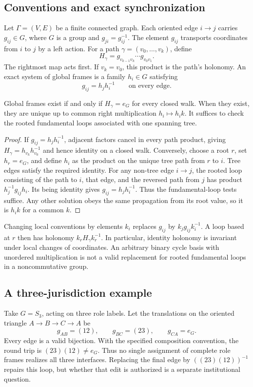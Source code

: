 \subsection{Conventions and exact synchronization}
Let $\Gamma=(V,E)$ be a finite connected graph. Each oriented edge $i\to j$ carries $g_{ij}\in G$, where $G$ is a group and $g_{ji}=g_{ij}^{-1}$. The element $g_{ij}$ transports coordinates from $i$ to $j$ by a left action. For a path $\gamma=(v_0,\ldots,v_k)$, define
\[
H_\gamma=g_{v_{k-1}v_k}\cdots g_{v_0v_1}.
\]
The rightmost map acts first. If $v_k=v_0$, this product is the path's holonomy. An exact system of global frames is a family $h_i\in G$ satisfying
\[
g_{ij}=h_jh_i^{-1}\qquad\text{on every edge}.
\]

\begin{MStheorem}\label{MS:thm:holonomy}
Global frames exist if and only if $H_\gamma=e_G$ for every closed walk. When they exist, they are unique up to common right multiplication $h_i\mapsto h_i k$. It suffices to check the rooted fundamental loops associated with one spanning tree.
\end{MStheorem}
\begin{proof}
If $g_{ij}=h_jh_i^{-1}$, adjacent factors cancel in every path product, giving $H_\gamma=h_{v_k}h_{v_0}^{-1}$ and hence identity on a closed walk. Conversely, choose a root $r$, set $h_r=e_G$, and define $h_i$ as the product on the unique tree path from $r$ to $i$. Tree edges satisfy the required identity. For any non-tree edge $i\to j$, the rooted loop consisting of the path to $i$, that edge, and the reversed path from $j$ has product $h_j^{-1}g_{ij}h_i$. Its being identity gives $g_{ij}=h_jh_i^{-1}$. Thus the fundamental-loop tests suffice. Any other solution obeys the same propagation from its root value, so it is $h_i k$ for a common $k$.
\end{proof}

Changing local conventions by elements $k_i$ replaces $g_{ij}$ by $k_jg_{ij}k_i^{-1}$. A loop based at $r$ then has holonomy $k_rH_\gamma k_r^{-1}$. In particular, identity holonomy is invariant under local changes of coordinates. An arbitrary binary cycle basis with unordered multiplication is not a valid replacement for rooted fundamental loops in a noncommutative group.

\subsection{A three-jurisdiction example}
Take $G=S_3$, acting on three role labels. Let the translations on the oriented triangle $A\to B\to C\to A$ be
\[
g_{AB}=(12),\qquad g_{BC}=(23),\qquad g_{CA}=e_G.
\]
Every edge is a valid bijection. With the specified composition convention, the round trip is $(23)(12)\ne e_G$. Thus no single assignment of complete role frames realizes all three interfaces. Replacing the final edge by $((23)(12))^{-1}$ repairs this loop, but whether that edit is authorized is a separate institutional question.

